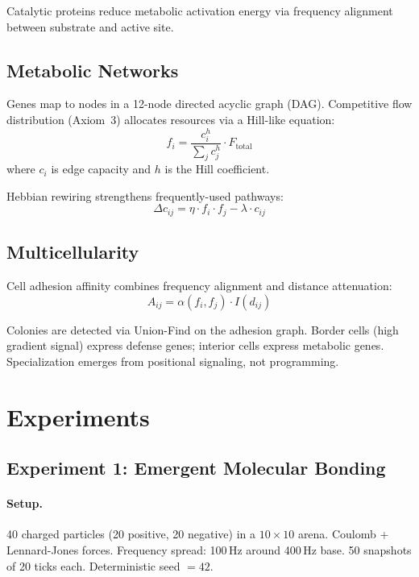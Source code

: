 \documentclass[11pt,a4paper]{article}
\begin{document}
Catalytic proteins reduce metabolic activation energy
via frequency alignment between substrate and active site.

\subsection{Metabolic Networks}

Genes map to nodes in a 12-node directed acyclic graph (DAG).
Competitive flow distribution (Axiom~3) allocates resources
via a Hill-like equation:
\begin{equation}
  f_i = \frac{c_i^h}{\sum_j c_j^h} \cdot F_{\text{total}}
\end{equation}
where $c_i$ is edge capacity and $h$ is the Hill coefficient.

Hebbian rewiring strengthens frequently-used pathways:
\begin{equation}
  \Delta c_{ij} = \eta \cdot f_i \cdot f_j - \lambda \cdot c_{ij}
\end{equation}

\subsection{Multicellularity}

Cell adhesion affinity combines frequency alignment and
distance attenuation:
\begin{equation}
  A_{ij} = \alpha(f_i, f_j) \cdot I(d_{ij})
\end{equation}

Colonies are detected via Union-Find on the adhesion graph.
Border cells (high gradient signal) express defense genes;
interior cells express metabolic genes. Specialization
emerges from positional signaling, not programming.

\section{Experiments}
\label{sec:experiments}

\subsection{Experiment 1: Emergent Molecular Bonding}

\paragraph{Setup.}
40 charged particles (20 positive, 20 negative) in a
$10 \times 10$ arena. Coulomb + Lennard-Jones forces.
Frequency spread: 100\,Hz around 400\,Hz base.
50 snapshots of 20 ticks each. Deterministic seed $= 42$.
\end{document}
